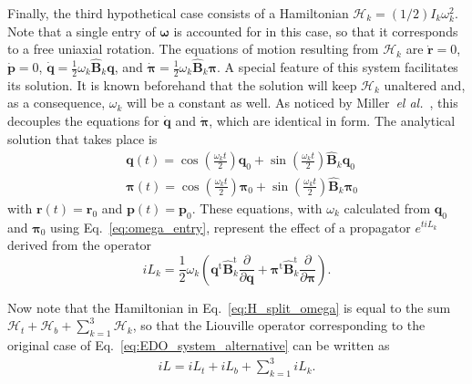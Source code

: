 \documentclass[aip,jcp,reprint,amsmath,amssymb]{revtex4-1}
\newcommand{\mt}[1]{\boldsymbol{\mathbf{#1}}}           %
\newcommand{\vt}[1]{\boldsymbol{\mathbf{#1}}}           %
\newcommand{\tr}[1]{#1^\text{t}}                        %
\newcommand{\diff}[2]{\dfrac{\partial #1}{\partial #2}} %
\begin{document}
Finally, the third hypothetical case consists of a Hamiltonian $\mathcal{H}_k = (1/2) I_k \omega_k^2$. Note that a single entry of $\vt \omega$ is accounted for in this case, so that it corresponds to a free uniaxial rotation. The equations of motion resulting from $\mathcal{H}_k$ are $\dot{\vt r} = 0$, $\dot{\vt p} = 0$, $\dot{\vt q} = \frac{1}{2} \omega_k \hat{\mt B}_k \vt q$, and $\dot{\vt \pi} = \frac{1}{2} \omega_k \hat{\mt B}_k \vt \pi$. A special feature of this system facilitates its solution. It is known beforehand that the solution will keep $\mathcal{H}_k$ unaltered and, as a consequence, $\omega_k$ will be a constant as well. As noticed by Miller~\textit{el al.}~\cite{Miller2002}, this decouples the equations for $\dot{\vt q}$ and $\dot{\vt \pi}$, which are identical in form. The analytical solution that takes place is\cite{Miller2002}
\begin{align*}
&{\vt q}(t) = \cos\left(\frac{\omega_k t}{2}\right) \vt q_0 + \sin\left(\frac{\omega_k t}{2}\right) \hat{\mt B}_k \vt q_0 \\
&{\vt \pi}(t) = \cos\left(\frac{\omega_k t}{2}\right) \vt \pi_0 + \sin\left(\frac{\omega_k t}{2}\right) \hat{\mt B}_k \vt \pi_0
\end{align*}
with ${\vt r}(t) = {\vt r}_0$ and ${\vt p}(t) = {\vt p}_0$. These equations, with $\omega_k$ calculated from $\vt q_0$ and $\vt \pi_0$ using Eq.~\ref{eq:omega_entry}, represent the effect of a propagator $e^{t i\!L_k}$ derived from the operator
\[
i\!L_k = \frac{1}{2} \omega_k \left( \tr{\vt q}\tr{\hat{\mt B}_k} \diff{}{\vt q} + \tr{\vt \pi}\tr{\hat{\mt B}_k} \diff{}{\vt \pi} \right).
\]

Now note that the Hamiltonian in Eq.~\ref{eq:H_split_omega} is equal to the sum ${\mathcal H}_t + {\mathcal H}_b + \sum_{k=1}^3 {\mathcal H}_k$, so that the Liouville operator corresponding to the original case of Eq.~\ref{eq:EDO_system_alternative} can be written as
\begin{align}
\label{eq:full_operator}
i\!L = i\!L_t + i\!L_b + \sum_{k=1}^3 i\!L_k.
\end{align}
\end{document}

